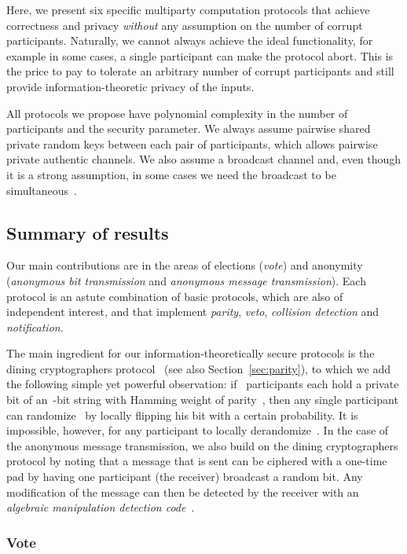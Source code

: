 \documentclass[11pt]{article}
\begin{document}
Here, we present six specific multiparty computation protocols that
achieve  correctness  and privacy \emph{without} any assumption on
the number of corrupt participants. Naturally, we cannot always
achieve the ideal functionality, for example in some cases, a single
participant can make the protocol abort. This is the price to pay to
tolerate an arbitrary number of corrupt participants and still
provide information-theoretic privacy of the inputs.

All protocols we propose have polynomial complexity in the number of
participants and the security parameter. We always assume pairwise
shared private random keys between each pair of participants, which
allows pairwise private authentic channels. We also assume a
broadcast channel and, even though it is a strong assumption,  in
some cases we need the broadcast to be
simultaneous~\cite{CGMW85,HD05}.





\subsection{Summary of results}

Our main contributions are in the areas of elections (\emph{vote})
and anonymity (\emph{anonymous bit transmission} and \emph{anonymous
message transmission}). Each protocol is an astute combination of
basic protocols, which are also of independent interest, and that
implement \emph{parity}, \emph{veto}, \emph{collision detection} and
\emph{notification}.

The main ingredient for our information-theoretically  secure
protocols is the dining cryptographers protocol~\cite{Chaum88} (see
also Section~\ref{sec:parity}), to which we add the following simple
yet powerful observation: if~ participants each hold a private
bit of an~-bit string with Hamming weight of parity~, then any
single participant can randomize~ by locally flipping his bit
with a certain probability. It is impossible, however, for any
participant to locally derandomize~. In the case of the anonymous
message transmission, we also build on the dining cryptographers
protocol by noting that a message that is sent  can be ciphered with
a one-time pad by having one participant (the receiver) broadcast a
random bit. Any modification of the message can then be detected by
the receiver with an \emph{algebraic manipulation detection
code}~\cite{CFP07}.


\subsubsection{Vote}
\end{document}
